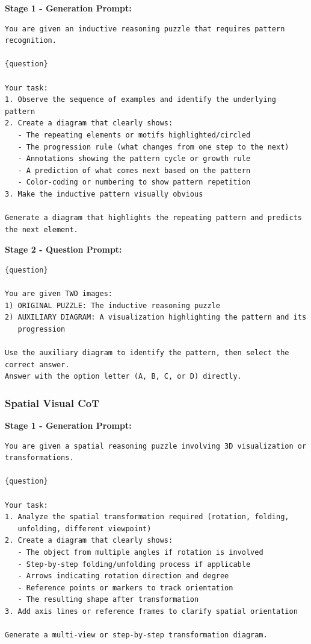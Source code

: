 \documentclass{article}
\theoremstyle{plain}
\theoremstyle{definition}
\theoremstyle{remark}
\begin{document}
\textbf{Stage 1 - Generation Prompt:}

\begin{verbatim}
You are given an inductive reasoning puzzle that requires pattern
recognition.

{question}

Your task:
1. Observe the sequence of examples and identify the underlying pattern
2. Create a diagram that clearly shows:
   - The repeating elements or motifs highlighted/circled
   - The progression rule (what changes from one step to the next)
   - Annotations showing the pattern cycle or growth rule
   - A prediction of what comes next based on the pattern
   - Color-coding or numbering to show pattern repetition
3. Make the inductive pattern visually obvious

Generate a diagram that highlights the repeating pattern and predicts
the next element.
\end{verbatim}

\textbf{Stage 2 - Question Prompt:}

\begin{verbatim}
{question}

You are given TWO images:
1) ORIGINAL PUZZLE: The inductive reasoning puzzle
2) AUXILIARY DIAGRAM: A visualization highlighting the pattern and its
   progression

Use the auxiliary diagram to identify the pattern, then select the
correct answer.
Answer with the option letter (A, B, C, or D) directly.
\end{verbatim}

\subsubsection{Spatial Visual CoT}

\textbf{Stage 1 - Generation Prompt:}

\begin{verbatim}
You are given a spatial reasoning puzzle involving 3D visualization or
transformations.

{question}

Your task:
1. Analyze the spatial transformation required (rotation, folding,
   unfolding, different viewpoint)
2. Create a diagram that clearly shows:
   - The object from multiple angles if rotation is involved
   - Step-by-step folding/unfolding process if applicable
   - Arrows indicating rotation direction and degree
   - Reference points or markers to track orientation
   - The resulting shape after transformation
3. Add axis lines or reference frames to clarify spatial orientation

Generate a multi-view or step-by-step transformation diagram.
\end{verbatim}
\end{document}

